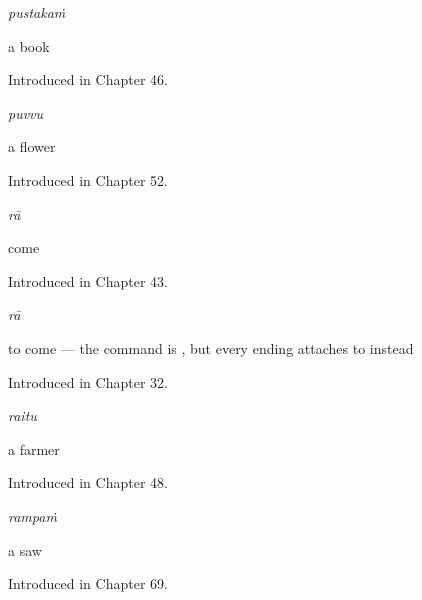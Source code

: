 \noindent\begin{minipage}[t]{\linewidth}
\raggedright
\textbf{}\enspace\emph{pustakaṁ}\par
\small a book\par
\footnotesize Introduced in Chapter 46.
\end{minipage}\par\medskip

\noindent\begin{minipage}[t]{\linewidth}
\raggedright
\textbf{}\enspace\emph{puvvu}\par
\small a flower\par
\footnotesize Introduced in Chapter 52.
\end{minipage}\par\medskip

\noindent\begin{minipage}[t]{\linewidth}
\raggedright
\textbf{}\enspace\emph{rā}\par
\small come\par
\footnotesize Introduced in Chapter 43.
\end{minipage}\par\medskip

\noindent\begin{minipage}[t]{\linewidth}
\raggedright
\textbf{}\enspace\emph{rā}\par
\small to come — the command is , but every ending attaches to  instead\par
\footnotesize Introduced in Chapter 32.
\end{minipage}\par\medskip

\noindent\begin{minipage}[t]{\linewidth}
\raggedright
\textbf{}\enspace\emph{raitu}\par
\small a farmer\par
\footnotesize Introduced in Chapter 48.
\end{minipage}\par\medskip

\noindent\begin{minipage}[t]{\linewidth}
\raggedright
\textbf{}\enspace\emph{rampaṁ}\par
\small a saw\par
\footnotesize Introduced in Chapter 69.
\end{minipage}\par\medskip

